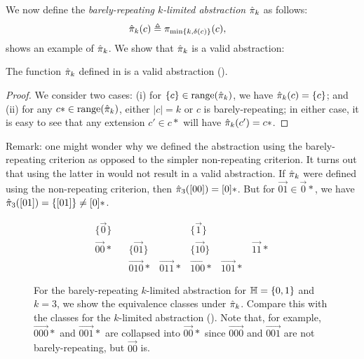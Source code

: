 We now define the {\em barely-repeating $k$-limited abstraction} $\hat{\pi}_k$ as follows:
\begin{align}
\label{eqn:barelyAbstraction}
\hat{\pi}_k(c) & \triangleq \pi_{\min\{k,\delta(c)\}}(c),
\end{align}
 shows an example of $\hat{\pi}_k$.
We show that $\hat{\pi}_k$ is a valid abstraction:
\begin{proposition}
\label{prop:barelyAbstraction}
The function $\hat{\pi}_k$ defined in  is a valid abstraction
().
\end{proposition}
\begin{proof}
We consider two cases: (i) for $\{c\} \in \text{\rm range}(\hat{\pi}_k)$,
we have $\hat{\pi}_k(c) = \{c\}$; and (ii) for any $c* \in \text{\rm range}(\hat{\pi}_k)$,
either $|c| = k$ or $c$ is barely-repeating; in either case,
it is easy to see that any extension $c' \in c*$ will have $\hat{\pi}_k(c') = c*$.
\end{proof}
Remark: one might wonder why we defined the abstraction using the barely-repeating criterion
as opposed to the simpler non-repeating criterion.
It turns out that using the latter in  would not result in a valid abstraction.
If $\hat{\pi}_k$ were defined using the non-repeating criterion,
then $\hat{\pi}_3([00]) = [0]*$.
But for $\vec{01} \in \vec{0}*$, we have $\hat{\pi}_3([01]) = \{[01]\} \neq [0]*$.

\begin{figure}
\[
\begin{array}{lllllll}
\{\vec{0}\}    &            &              &            & \{\vec{1}\} \\
\vec{00}*      &            & \{\vec{01}\} &            & \{\vec{10}\} &            & \vec{11}* \\
               &            & \vec{010}*   & \vec{011}* & \vec{100}*   & \vec{101}* &
\end{array}
\]
\caption{\label{fig:barelyExample} For the barely-repeating $k$-limited abstraction
for ${\mathbb H} = \{0,1\}$ and $k = 3$, we show the equivalence classes under $\hat{\pi}_k$.
Compare this with the classes for the $k$-limited abstraction ().
Note that, for example,
$\vec{000}*$ and $\vec{001}*$ are collapsed into $\vec{00}*$ since $\vec{000}$ and $\vec{001}$ are not barely-repeating,
but $\vec{00}$ is.
}
\end{figure}


